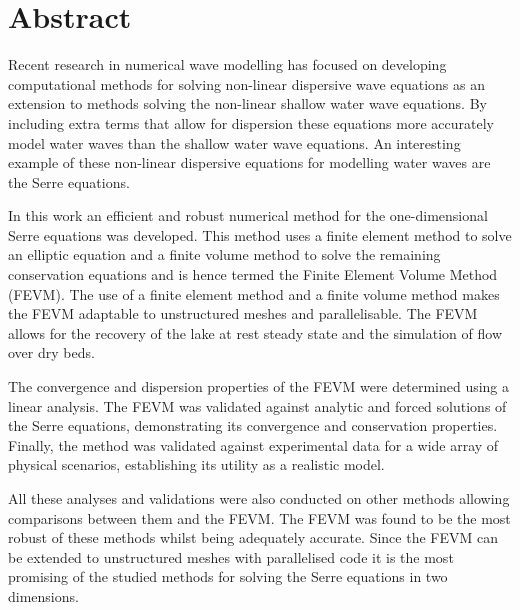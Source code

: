 \chapter*{Abstract}\label{abstract}


Recent research in numerical wave modelling has focused on developing computational methods for solving non-linear dispersive wave equations as an extension to methods solving the non-linear shallow water wave equations. By including extra terms that allow for dispersion these equations more accurately model water waves than the shallow water wave equations. An interesting example of these non-linear dispersive equations for modelling water waves are the Serre equations. 

In this work an efficient and robust numerical method for the one-dimensional Serre equations was developed. This method uses a finite element method to solve an elliptic equation and a finite volume method to solve the remaining conservation equations and is hence termed the Finite Element Volume Method (FEVM). The use of a finite element method and a finite volume method makes the FEVM adaptable to unstructured meshes and parallelisable. The FEVM allows for the recovery of the lake at rest steady state and the simulation of flow over dry beds.

The convergence and dispersion properties of the FEVM were determined using a linear analysis. The FEVM was validated against analytic and forced solutions of the Serre equations, demonstrating its convergence and conservation properties. Finally, the method was validated against experimental data for a wide array of physical scenarios, establishing its utility as a realistic model.

All these analyses and validations were also conducted on other methods allowing comparisons between them and the FEVM. The FEVM was found to be the most robust of these methods whilst being adequately accurate. Since the FEVM can be extended to unstructured meshes with parallelised code it is the most promising of the studied methods for solving the Serre equations in two dimensions.  


